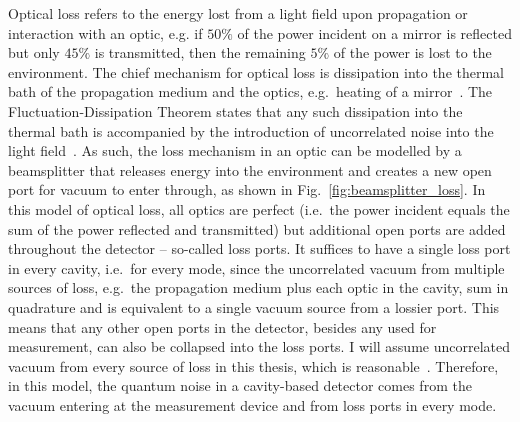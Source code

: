 Optical loss refers to the energy lost from a light field upon propagation or interaction with an optic, e.g. if $50\%$ of the power incident on a mirror is reflected but only $45\%$ is transmitted, then the remaining $5\%$ of the power is lost to the environment. The chief mechanism for optical loss is dissipation into the thermal bath of the propagation medium and the optics, e.g.\ heating of a mirror~\cite{}. The Fluctuation-Dissipation Theorem states that any such dissipation into the thermal bath is accompanied by the introduction of uncorrelated noise into the light field~\cite{}. As such, the loss mechanism in an optic can be modelled by a beamsplitter that releases energy into the environment and creates a new open port for vacuum to enter through, as shown in Fig.~\ref{fig:beamsplitter_loss}. In this model of optical loss, all optics are perfect (i.e.\ the power incident equals the sum of the power reflected and transmitted) but additional open ports are added throughout the detector -- so-called loss ports. It suffices to have a single loss port in every cavity, i.e.\ for every mode, since the uncorrelated vacuum from multiple sources of loss, e.g.\ the propagation medium plus each optic in the cavity, sum in quadrature and is equivalent to a single vacuum source from a lossier port. %
This means that any other open ports in the detector, besides any used for measurement, can also be collapsed into the loss ports. I will assume uncorrelated vacuum from every source of loss in this thesis, which is reasonable~\cite{}. Therefore, in this model, the quantum noise in a cavity-based detector comes from the vacuum entering at the measurement device and from loss ports in every mode.

